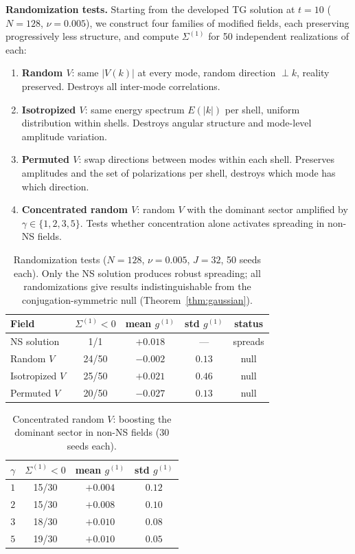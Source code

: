 \documentclass[11pt]{article}
\theoremstyle{definition}
\begin{document}
\medskip\noindent\textbf{Randomization tests.}
Starting from the developed TG solution at $t=10$
($N=128$, $\nu=0.005$), we construct four families
of modified fields, each preserving progressively
less structure, and compute $\Sigma^{(1)}$ for
50 independent realizations of each:

\begin{enumerate}[leftmargin=2em]
\item \textbf{Random $V$}: same $|V(k)|$ at every
  mode, random direction $\perp k$, reality
  preserved.  Destroys all inter-mode correlations.
\item \textbf{Isotropized $V$}: same energy spectrum
  $E(|k|)$ per shell, uniform distribution within
  shells.  Destroys angular structure and mode-level
  amplitude variation.
\item \textbf{Permuted $V$}: swap directions between
  modes within each shell.  Preserves amplitudes and
  the set of polarizations per shell, destroys which
  mode has which direction.
\item \textbf{Concentrated random $V$}: random $V$
  with the dominant sector amplified by
  $\gamma\in\{1,2,3,5\}$.  Tests whether
  concentration alone activates spreading in
  non-NS fields.
\end{enumerate}

\begin{table}[h]
\centering
\caption{Randomization tests ($N=128$, $\nu=0.005$,
$J=32$, 50 seeds each).  Only the NS solution
produces robust spreading; all randomizations give
results indistinguishable from the
conjugation-symmetric null
(Theorem~\ref{thm:gaussian}).}
\label{tab:randomization}
\begin{tabular}{@{}lcccc@{}}
\toprule
\textbf{Field} & $\Sigma^{(1)}<0$
  & mean $g^{(1)}$ & std $g^{(1)}$
  & status \\
\midrule
NS solution & 1/1 & $+0.018$ & ---
  & spreads \\
Random $V$ & 24/50 & $-0.002$ & $0.13$
  & null \\
Isotropized $V$ & 25/50 & $+0.021$ & $0.46$
  & null \\
Permuted $V$ & 20/50 & $-0.027$ & $0.13$
  & null \\
\bottomrule
\end{tabular}
\end{table}

\begin{table}[h]
\centering
\caption{Concentrated random $V$: boosting the
dominant sector in non-NS fields (30 seeds each).}
\label{tab:conc-random}
\begin{tabular}{@{}cccc@{}}
\toprule
$\gamma$ & $\Sigma^{(1)}<0$ & mean $g^{(1)}$
  & std $g^{(1)}$ \\
\midrule
$1$ & 15/30 & $+0.004$ & $0.12$ \\
$2$ & 15/30 & $+0.008$ & $0.10$ \\
$3$ & 18/30 & $+0.010$ & $0.08$ \\
$5$ & 19/30 & $+0.010$ & $0.05$ \\
\bottomrule
\end{tabular}
\end{table}
\end{document}
